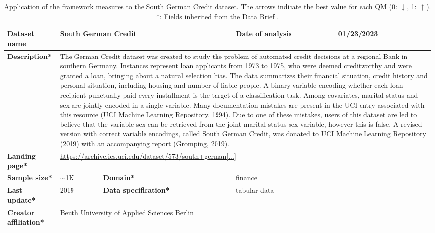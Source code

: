 \begin{table}[h]
    \caption{Application of the framework measures to the South German Credit dataset. The arrows indicate the best value for each QM (0: $\downarrow$, 1: $\uparrow$). *: Fields inherited from the Data Brief \cite{fabrisAlgorithmicFairnessDatasets2022}.}
    \label{tab:SouthGermanCredit}
    \begin{tabular}{|p{3cm}|p{1.9cm}p{3cm}p{2.6cm}p{1.6cm}|}
        \hline
        \textbf{Dataset name} & \multicolumn{2}{l|}{South German Credit} & \multicolumn{1}{l|}{\textbf{Date of analysis}} & 01/23/2023 \\ \hline
        \textbf{Description*} & \multicolumn{4}{p{10cm}|}{The German Credit dataset was created to study the problem of automated credit decisions at a regional Bank in southern Germany. Instances represent loan applicants from 1973 to 1975, who were deemed creditworthy and were granted a loan, bringing about a natural selection bias. The data summarizes their financial situation, credit history and personal situation, including housing and number of liable people. A binary variable encoding whether each loan recipient punctually paid every installment is the target of a classification task. Among covariates, marital status and sex are jointly encoded in a single variable. Many documentation mistakes are present in the UCI entry associated with this resource (UCI Machine Learning Repository, 1994). Due to one of these mistakes, users of this dataset are led to believe that the variable sex can be retrieved from the joint marital status-sex variable, however this is false. A revised version with correct variable encodings, called South German Credit, was donated to UCI Machine Learning Repository (2019) with an accompanying report (Gromping, 2019).} \\ \hline
        \textbf{Landing page*} & \multicolumn{4}{l|}{\href{https://archive.ics.uci.edu/dataset/573/south+german+credit+update}{https://archive.ics.uci.edu/dataset/573/south+german[...]}} \\ \hline
        \textbf{Sample size*} & $\sim$1K & \multicolumn{1}{|l}{\textbf{Domain*}} & \multicolumn{2}{|l|}{finance}  \\ \hline
        \textbf{Last update*} & 2019 & \multicolumn{1}{|p{3cm}}{\textbf{Data specification*}} & \multicolumn{2}{|l|}{tabular data} \\ \hline
        \textbf{Creator affiliation*} & \multicolumn{4}{l|}{Beuth University of Applied Sciences Berlin} \\ \hline\hline

\end{tabular}
\end{table}

